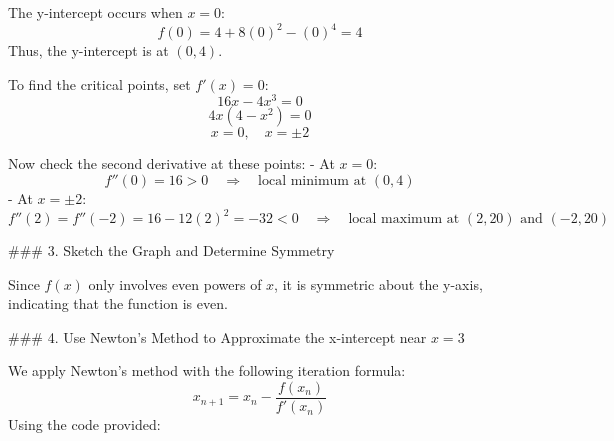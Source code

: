 \documentclass[11pt]{article}
\begin{document}
The y-intercept occurs when \( x = 0 \):
\[
f(0) = 4 + 8(0)^2 - (0)^4 = 4
\]
Thus, the y-intercept is at \( (0, 4) \).

To find the critical points, set \( f'(x) = 0 \):
\[
16x - 4x^3 = 0
\]
\[
4x(4 - x^2) = 0
\]
\[
x = 0, \quad x = \pm 2
\]

Now check the second derivative at these points:
- At \( x = 0 \):
  \[
  f''(0) = 16 > 0 \quad \Rightarrow \quad \text{local minimum at } (0, 4)
  \]
- At \( x = \pm 2 \):
  \[
  f''(2) = f''(-2) = 16 - 12(2)^2 = -32 < 0 \quad \Rightarrow \quad \text{local maximum at } (2, 20) \text{ and } (-2, 20)
  \]

### 3. Sketch the Graph and Determine Symmetry

\begin{center}
    \end{center}

Since \( f(x) \) only involves even powers of \( x \), it is symmetric about the y-axis, indicating that the function is even.

### 4. Use Newton's Method to Approximate the x-intercept near \( x = 3 \)

We apply Newton's method with the following iteration formula:
\[
x_{n+1} = x_n - \frac{f(x_n)}{f'(x_n)}
\]
Using the code provided:
\end{document}
